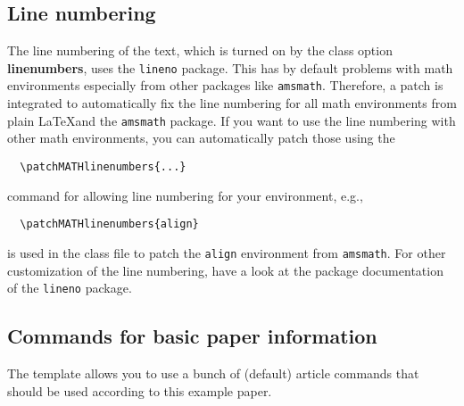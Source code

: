 \documentclass[%
  a4paper,
  twocolumn,
  colorlinks,
]{preprint}
\begin{document}

\subsection{Line numbering}%
\label{subsec:linenumbers}

The line numbering of the text, which is turned on by the class option
\textbf{\textsf{linenumbers}}, uses the \verb|lineno| package.
This has by default problems with math environments especially from other
packages like \verb|amsmath|.
Therefore, a patch is integrated to automatically fix the line numbering for all
math environments from plain \LaTeX and the \verb|amsmath| package.
If you want to use the line numbering with other math environments, you can
automatically patch those using the
\begin{verbatim}
  \patchMATHlinenumbers{...}
\end{verbatim}
command for allowing line numbering for your environment, e.g.,
\begin{verbatim}
  \patchMATHlinenumbers{align}
\end{verbatim}
is used in the class file to patch the \verb|align| environment from
\verb|amsmath|.
For other customization of the line numbering, have a look at the package
documentation of the \verb|lineno| package.


\subsection{Commands for basic paper information}%
\label{subsec:meta}

The template allows you to use a bunch of (default) article commands that should
be used according to this example paper.
\end{document}
